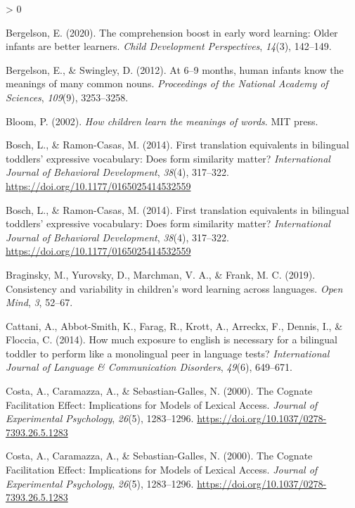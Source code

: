 \documentclass[
  english,
  man,man,floatsintext]{apa6}
\newlength{\cslhangindent}
\newenvironment{CSLReferences}[2] %
 {%
  \setlength{\parindent}{0pt}
  \ifodd #1 \everypar{\setlength{\hangindent}{\cslhangindent}}\ignorespaces\fi
  \ifnum #2 > 0
  \setlength{\parskip}{#2\baselineskip}
  \fi
 }%
 {}
\begin{document}
\hypertarget{refs}{}
\begin{CSLReferences}{1}{0}
\leavevmode\hypertarget{ref-bergelson2020comprehension}{}%
Bergelson, E. (2020). The comprehension boost in early word learning: Older infants are better learners. \emph{Child Development Perspectives}, \emph{14}(3), 142--149.

\leavevmode\hypertarget{ref-bergelson2012months}{}%
Bergelson, E., \& Swingley, D. (2012). At 6--9 months, human infants know the meanings of many common nouns. \emph{Proceedings of the National Academy of Sciences}, \emph{109}(9), 3253--3258.

\leavevmode\hypertarget{ref-bloom2002children}{}%
Bloom, P. (2002). \emph{How children learn the meanings of words}. MIT press.

\leavevmode\hypertarget{ref-bosch2014first}{}%
Bosch, L., \& Ramon-Casas, M. (2014). First translation equivalents in bilingual toddlers' expressive vocabulary: {Does} form similarity matter? \emph{International Journal of Behavioral Development}, \emph{38}(4), 317--322. \url{https://doi.org/10.1177/0165025414532559}

\leavevmode\hypertarget{ref-bosch2014first}{}%
Bosch, L., \& Ramon-Casas, M. (2014). First translation equivalents in bilingual toddlers' expressive vocabulary: {Does} form similarity matter? \emph{International Journal of Behavioral Development}, \emph{38}(4), 317--322. \url{https://doi.org/10.1177/0165025414532559}

\leavevmode\hypertarget{ref-braginsky2019consistency}{}%
Braginsky, M., Yurovsky, D., Marchman, V. A., \& Frank, M. C. (2019). Consistency and variability in children's word learning across languages. \emph{Open Mind}, \emph{3}, 52--67.

\leavevmode\hypertarget{ref-cattani2014much}{}%
Cattani, A., Abbot-Smith, K., Farag, R., Krott, A., Arreckx, F., Dennis, I., \& Floccia, C. (2014). How much exposure to english is necessary for a bilingual toddler to perform like a monolingual peer in language tests? \emph{International Journal of Language \& Communication Disorders}, \emph{49}(6), 649--671.

\leavevmode\hypertarget{ref-costa2000cognate}{}%
Costa, A., Caramazza, A., \& Sebastian-Galles, N. (2000). The {Cognate} {Facilitation} {Effect}: {Implications} for {Models} of {Lexical} {Access}. \emph{Journal of Experimental Psychology}, \emph{26}(5), 1283--1296. \url{https://doi.org/10.1037/0278-7393.26.5.1283}

\leavevmode\hypertarget{ref-costa2000cognate}{}%
Costa, A., Caramazza, A., \& Sebastian-Galles, N. (2000). The {Cognate} {Facilitation} {Effect}: {Implications} for {Models} of {Lexical} {Access}. \emph{Journal of Experimental Psychology}, \emph{26}(5), 1283--1296. \url{https://doi.org/10.1037/0278-7393.26.5.1283}


\end{CSLReferences}
\end{document}
